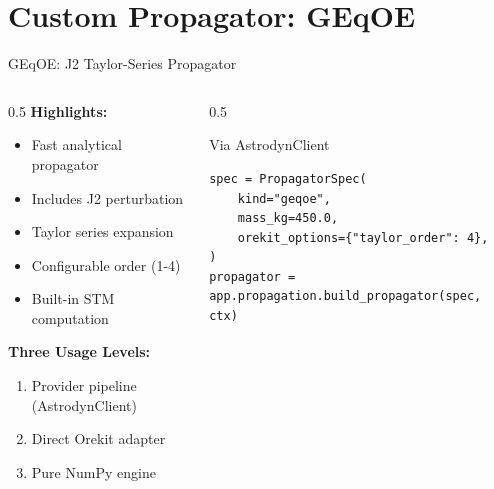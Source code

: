 \documentclass[aspectratio=169,12pt]{beamer}
\begin{document}
\section{Custom Propagator: GEqOE}

\begin{frame}[fragile]{GEqOE: J2 Taylor-Series Propagator}
    \begin{columns}
        \begin{column}{0.5\textwidth}
            \textbf{Highlights:}
            \begin{itemize}
                \item Fast analytical propagator
                \item Includes J2 perturbation
                \item Taylor series expansion
                \item Configurable order (1-4)
                \item Built-in STM computation
            \end{itemize}
            \vspace{0.3cm}
            \textbf{Three Usage Levels:}
            \begin{enumerate}
                \item Provider pipeline (AstrodynClient)
                \item Direct Orekit adapter
                \item Pure NumPy engine
            \end{enumerate}
        \end{column}
        \begin{column}{0.5\textwidth}
            \begin{block}{Via AstrodynClient}
                \begin{verbatim}
spec = PropagatorSpec(
    kind="geqoe",
    mass_kg=450.0,
    orekit_options={"taylor_order": 4},
)
propagator = app.propagation.build_propagator(spec, ctx)
                \end{verbatim}
            \end{block}
        \end{column}
    \end{columns}
\end{frame}
\end{document}
